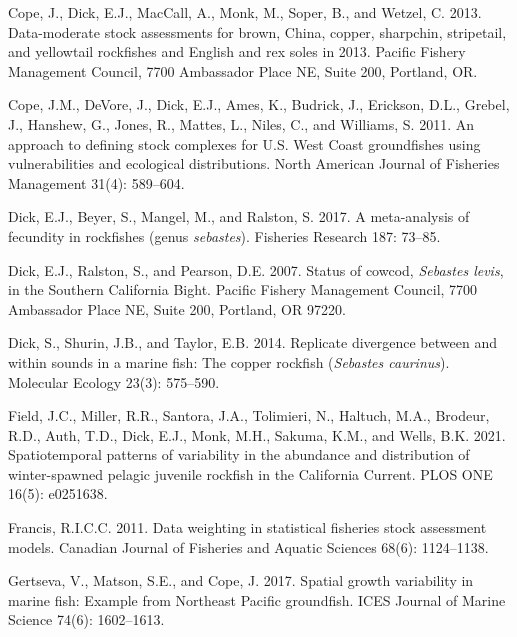 \documentclass[11pt,
  english,
  a4paper,
]{article}
\newlength{\cslhangindent}
\newenvironment{CSLReferences}[2] %
 {%
  \setlength{\parindent}{0pt}
  \ifodd #1 \everypar{\setlength{\hangindent}{\cslhangindent}}\ignorespaces\fi
  \ifnum #2 > 0
  \setlength{\parskip}{#2\baselineskip}
  \fi
 }%
 {}
\begin{document}
\begin{CSLReferences}{1}{0}
\leavevmode{}%
Cope, J., Dick, E.J., MacCall, A., Monk, M., Soper, B., and Wetzel, C. 2013. Data-moderate stock assessments for brown, {China}, copper, sharpchin, stripetail, and yellowtail rockfishes and {English} and rex soles in 2013. Pacific Fishery Management Council, 7700 Ambassador Place NE, Suite 200, Portland, OR.

\leavevmode{}%
Cope, J.M., DeVore, J., Dick, E.J., Ames, K., Budrick, J., Erickson, D.L., Grebel, J., Hanshew, G., Jones, R., Mattes, L., Niles, C., and Williams, S. 2011. An approach to defining stock complexes for {U}.{S}. {West} {Coast} groundfishes using vulnerabilities and ecological distributions. North American Journal of Fisheries Management 31(4): 589--604.

\leavevmode{}%
Dick, E.J., Beyer, S., Mangel, M., and Ralston, S. 2017. A meta-analysis of fecundity in rockfishes (genus \emph{sebastes}). Fisheries Research 187: 73--85.

\leavevmode{}%
Dick, E.J., Ralston, S., and Pearson, D.E. 2007. Status of cowcod, \emph{{Sebastes} levis}, in the {Southern} {California} {Bight}. Pacific Fishery Management Council, 7700 Ambassador Place NE, Suite 200, Portland, OR 97220.

\leavevmode{}%
Dick, S., Shurin, J.B., and Taylor, E.B. 2014. Replicate divergence between and within sounds in a marine fish: The copper rockfish (\emph{{Sebastes} caurinus}). Molecular Ecology 23(3): 575--590.

\leavevmode{}%
Field, J.C., Miller, R.R., Santora, J.A., Tolimieri, N., Haltuch, M.A., Brodeur, R.D., Auth, T.D., Dick, E.J., Monk, M.H., Sakuma, K.M., and Wells, B.K. 2021. Spatiotemporal patterns of variability in the abundance and distribution of winter-spawned pelagic juvenile rockfish in the {California} {Current}. PLOS ONE 16(5): e0251638.

\leavevmode{}%
Francis, R.I.C.C. 2011. Data weighting in statistical fisheries stock assessment models. Canadian Journal of Fisheries and Aquatic Sciences 68(6): 1124--1138.

\leavevmode{}%
Gertseva, V., Matson, S.E., and Cope, J. 2017. Spatial growth variability in marine fish: Example from {Northeast} {Pacific} groundfish. ICES Journal of Marine Science 74(6): 1602--1613.


\end{CSLReferences}
\end{document}

